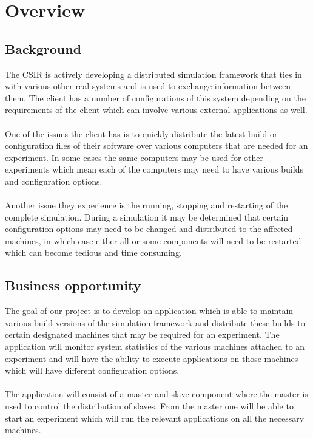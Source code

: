 \documentclass[a4paper,12pt,final]{article}
\begin{document}
\section{Overview}
\subsection{Background}
The CSIR is actively developing a distributed simulation framework that ties
in with various other real systems and is used to exchange information
between them. The client has a number of configurations of this system
depending on the requirements of the client which can involve various
external applications as well.\\
\textbf{\\}
One of the issues the client has is to quickly distribute the latest build or
configuration files of their software over various computers that are needed
for an experiment. In some cases the same computers may be used for other
experiments which mean each of the computers may need to have various
builds and configuration options.\\
\textbf{\\}
Another issue they experience is the running, stopping and restarting of
the complete simulation. During a simulation it may be determined that
certain configuration options may need to be changed and distributed to the
affected machines, in which case either all or some components will need to
be restarted which can become tedious and time consuming.
\subsection{Business opportunity}
The goal of our project is to develop an application which is able to maintain
various build versions of the simulation framework and distribute these builds
to certain designated machines that may be required for an experiment. The
application will monitor system statistics of the various machines attached
to an experiment and will have the ability to execute applications on those
machines which will have different configuration options.\\
\textbf{\\}
The application will consist of a master and slave component where the
master is used to control the distribution of slaves. From the master one will
be able to start an experiment which will run the relevant applications on all
the necessary machines.
\end{document}
